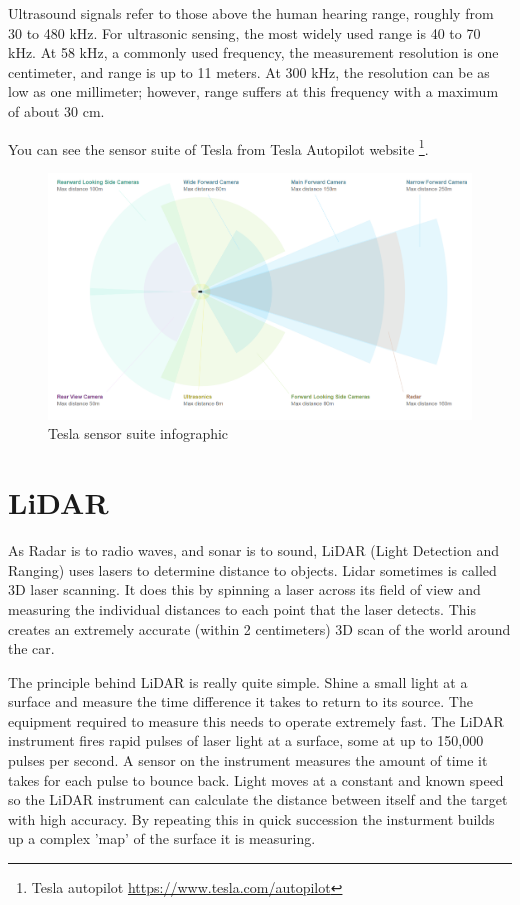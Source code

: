 Ultrasound signals refer to those above the human hearing range, roughly from 30
to 480 kHz. For ultrasonic sensing, the most widely used range is 40 to 70 kHz.
At 58 kHz, a commonly used frequency, the measurement resolution is one
centimeter, and range is up to 11 meters. At 300 kHz, the resolution can be as
low as one millimeter; however, range suffers at this frequency with a maximum
of about 30 cm.

You can see the sensor suite of Tesla  from
Tesla Autopilot website \footnote{Tesla autopilot
\url{https://www.tesla.com/autopilot}}.

\begin{figure}[!ht]
    \centering
    \includegraphics[width=150mm, keepaspectratio]{figures/teslasensors.png}
    \caption{Tesla sensor suite infographic }
    \label{fig:teslasensors}
\end{figure}


\section{LiDAR}

As Radar is to radio waves, and sonar is to sound, LiDAR (Light Detection and
Ranging) uses lasers to determine distance to objects. Lidar sometimes is called
3D laser scanning. It does this by spinning a laser across its field of view and
measuring the individual distances to each point that the laser detects. This
creates an extremely accurate (within 2 centimeters) 3D scan of the world around
the car.

The principle behind LiDAR is really quite simple. Shine a small light at a
surface and measure the time difference it takes to return to its source. The
equipment required to measure this needs to operate extremely fast. The LiDAR
instrument fires rapid pulses of laser light at a surface, some at up to 150,000
pulses per second. A sensor on the instrument measures the amount of time it
takes for each pulse to bounce back. Light moves at a constant and known speed
so the LiDAR instrument can calculate the distance between itself and the target
with high accuracy. By repeating this in quick succession the insturment builds
up a complex 'map' of the surface it is measuring.

